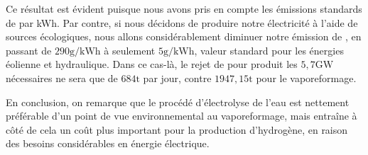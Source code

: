 \documentclass[a4paper, oneside, 12pt]{article}
\begin{document}
Ce résultat est évident puisque nous avons pris en compte 
les émissions standards de  par kWh.
Par contre, si nous décidons de produire notre électricité à l'aide de sources écologiques,
nous allons considérablement diminuer notre émission de , 
en passant de $290\si{\gram/\kilo\watt\hour}$ \cite{co2_europe} à seulement $5\si{\gram/\kilo\watt\hour}$, 
valeur standard pour les énergies éolienne et hydraulique. 
Dans ce cas-là, le rejet de  pour produit les $5,7\si{\giga\watt}$ nécessaires 
ne sera que de $684\si{\tonne}$ par jour, 
contre $1947,15\si{\tonne}$ pour le vaporeformage. 
\newline

En conclusion, on remarque que le procédé d'électrolyse de l'eau 
est nettement préférable d'un point de vue environnemental au vaporeformage, 
mais entraîne à côté de cela un coût plus important pour la production d'hydrogène,
en raison des besoins considérables en énergie électrique.

\printbibliography
\end{document}
